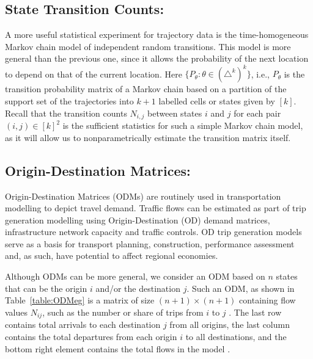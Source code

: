\documentclass[times,twocolumn,final,authoryear]{elsarticle}
\begin{document}
\subsection{State Transition Counts:}
A more useful statistical experiment for trajectory data is the time-homogeneous Markov chain model of independent random transitions. This model is more general than the previous one, since it allows the probability of the next location to depend on that of the current location.   
Here $\{P_{\theta}: \theta \in (\triangle^k)^k\}$, i.e., $P_{\theta}$ is the transition probability matrix of a Markov chain based on a partition of the support set of the trajectories into $k+1$ labelled cells or states given by $[k]$.  
Recall that the transition counts $N_{i,j}$ between states $i$ and $j$ for each pair $(i,j) \in [k]^2$ is the sufficient statistics for such a simple Markov chain model, as it will allow us to nonparametrically estimate the transition matrix itself.  

\subsection{Origin-Destination Matrices:}
Origin-Destination Matrices (ODMs) are routinely used in transportation modelling to depict travel demand.  
Traffic flows can be estimated as part of trip generation modelling using Origin-Destination (OD) demand matrices, infrastructure network capacity and traffic controls. 
OD trip generation models serve as a basis for transport planning, construction, performance assessment and, as such, have potential to affect regional economies. 

Although ODMs can be more general, we consider an ODM based on $n$ states that can be the origin $i$ and/or the destination $j$. 
Such an ODM, as shown in Table~\ref{table:ODMeg} is a matrix of size $(n+1) \times (n+1)$ containing flow values $N_{ij}$, such as the number or share of trips from $i$ to $j$ \citep{Rodrigue2009}.  
The last row contains total arrivals to each destination $j$ from all origins, the last column contains the total departures from each origin $i$ to all destinations, and the bottom right element contains the total flows in the model 
\citep{EVANS1970}.
\end{document}
